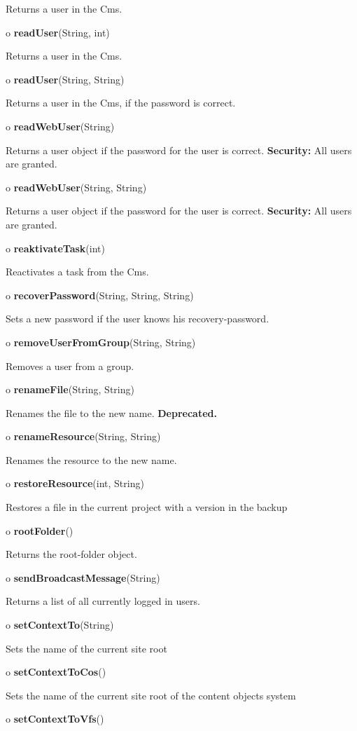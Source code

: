 \begin{description}
Returns a user in the Cms.  
\item o {\bf readUser}(String, int)  

Returns a user in the Cms.  
\item o {\bf readUser}(String, String)  

Returns a user in the Cms, if the password is correct.  
\item o {\bf readWebUser}(String)  

Returns a user object if the password for the user is correct. {\bf Security:}
All users are granted.  
\item o {\bf readWebUser}(String, String)  

Returns a user object if the password for the user is correct. {\bf Security:}
All users are granted.  
\item o {\bf reaktivateTask}(int)  

Reactivates a task from the Cms.  
\item o {\bf recoverPassword}(String, String, String)  

Sets a new password if the user knows his recovery-password.  
\item o {\bf removeUserFromGroup}(String, String)  

Removes a user from a group.  
\item o {\bf renameFile}(String, String)  

Renames the file to the new name. {\bf Deprecated.}  
\item o {\bf renameResource}(String, String)  

Renames the resource to the new name.  
\item o {\bf restoreResource}(int, String)  

Restores a file in the current project with a version in the backup  
\item o {\bf rootFolder}()  

Returns the root-folder object.  
\item o {\bf sendBroadcastMessage}(String)  

Returns a list of all currently logged in users.  
\item o {\bf setContextTo}(String)  

Sets the name of the current site root  
\item o {\bf setContextToCos}()  

Sets the name of the current site root of the content objects system  
\item o {\bf setContextToVfs}()  


\end{description}
